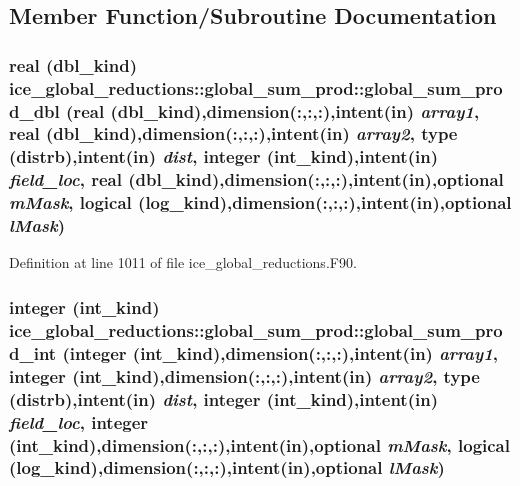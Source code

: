 \subsection{Member Function/Subroutine Documentation}
\hypertarget{interfaceice__global__reductions_1_1global__sum__prod_ad0ff33b868b9f2fb600754642e8866fd}{
\subsubsection[{global\_\-sum\_\-prod\_\-dbl}]{\setlength{\rightskip}{0pt plus 5cm}real (dbl\_\-kind) ice\_\-global\_\-reductions::global\_\-sum\_\-prod::global\_\-sum\_\-prod\_\-dbl (real (dbl\_\-kind),dimension(:,:,:),intent(in) {\em array1}, \/  real (dbl\_\-kind),dimension(:,:,:),intent(in) {\em array2}, \/  type ({\bf distrb}),intent(in) {\em dist}, \/  integer (int\_\-kind),intent(in) {\em field\_\-loc}, \/  real (dbl\_\-kind),dimension(:,:,:),intent(in),optional {\em mMask}, \/  logical (log\_\-kind),dimension(:,:,:),intent(in),optional {\em lMask})}}
\label{interfaceice__global__reductions_1_1global__sum__prod_ad0ff33b868b9f2fb600754642e8866fd}


Definition at line 1011 of file ice\_\-global\_\-reductions.F90.\hypertarget{interfaceice__global__reductions_1_1global__sum__prod_a696fe1ce83431f8c0fa3782742ee2e26}{
\subsubsection[{global\_\-sum\_\-prod\_\-int}]{\setlength{\rightskip}{0pt plus 5cm}integer (int\_\-kind) ice\_\-global\_\-reductions::global\_\-sum\_\-prod::global\_\-sum\_\-prod\_\-int (integer (int\_\-kind),dimension(:,:,:),intent(in) {\em array1}, \/  integer (int\_\-kind),dimension(:,:,:),intent(in) {\em array2}, \/  type ({\bf distrb}),intent(in) {\em dist}, \/  integer (int\_\-kind),intent(in) {\em field\_\-loc}, \/  integer (int\_\-kind),dimension(:,:,:),intent(in),optional {\em mMask}, \/  logical (log\_\-kind),dimension(:,:,:),intent(in),optional {\em lMask})}}
\label{interfaceice__global__reductions_1_1global__sum__prod_a696fe1ce83431f8c0fa3782742ee2e26}


